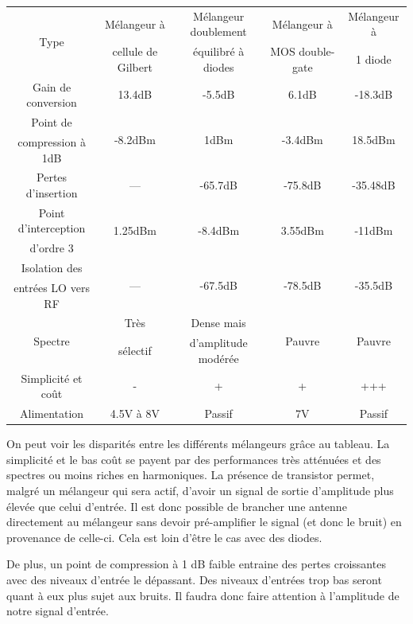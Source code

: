 \documentclass{article}
\begin{document}
\begin{tabular}{|c||c|c|c|c|}
\hline  \multirow{2}{*}{Type} & Mélangeur à & Mélangeur doublement & Mélangeur à &  Mélangeur à \\
							  & cellule de Gilbert & équilibré à diodes & MOS double-gate & 1 diode \\
\hline
\hline  Gain de conversion & 13.4dB &  -5.5dB & 6.1dB &  -18.3dB \\
\hline  Point de          & \multirow{2}{*}{-8.2dBm} & \multirow{2}{*}{1dBm} & \multirow{2}{*}{-3.4dBm} & \multirow{2}{*}{18.5dBm} \\
		compression à 1dB & &&&\\
\hline  Pertes d'insertion & --- & -65.7dB & -75.8dB & -35.48dB \\
\hline  Point d'interception & \multirow{2}{*}{1.25dBm} & \multirow{2}{*}{-8.4dBm} & \multirow{2}{*}{3.55dBm} & \multirow{2}{*}{-11dBm} \\
		d'ordre 3            & &&&\\
\hline  Isolation des & \multirow{2}{*}{---} & \multirow{2}{*}{-67.5dB} & \multirow{2}{*}{-78.5dB} & \multirow{2}{*}{-35.5dB} \\
		entrées LO vers RF & &&&\\
\hline  \multirow{2}{*}{Spectre} & Très & Dense mais & \multirow{2}{*}{Pauvre} & \multirow{2}{*}{Pauvre} \\
								 & sélectif & d'amplitude modérée &&\\
\hline  Simplicité et coût & - & + & + & +++ \\
\hline  Alimentation & 4.5V à 8V & Passif & 7V & Passif \\
\hline
\end{tabular}


On peut voir les disparités entre les différents mélangeurs grâce au tableau. La simplicité et le bas coût se payent par des performances très atténuées et des spectres ou moins riches en harmoniques. La présence de transistor permet, malgré un mélangeur qui sera actif, d'avoir un signal de sortie d'amplitude plus élevée que celui d'entrée. Il est donc possible de brancher une antenne directement au mélangeur sans devoir pré-amplifier le signal (et donc le bruit) en provenance de celle-ci. Cela est loin d'être le cas avec des diodes.


De plus, un point de compression à 1 dB faible entraine des pertes croissantes avec des niveaux d'entrée le dépassant. Des niveaux d'entrées trop bas seront quant à eux plus sujet aux bruits. Il faudra donc faire attention à l'amplitude de notre signal d'entrée.
\end{document}
